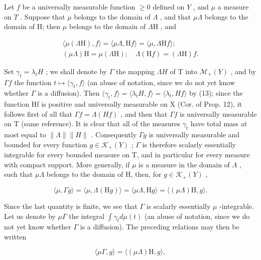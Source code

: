 Let \(f\) be a universally measurable function \(\geqslant 0\) defined on \(Y\) , and \(\mu\) a measure on \(T\) . Suppose that \(\mu\) belongs to the domain of \(\Lambda\) , and that \(\mu \Lambda\) belongs to the domain of H; then \(\mu\) belongs to the domain of \(\Lambda \mathrm{H}\) , and

\[
\begin{array}{l} \langle \mu (\Lambda \mathrm{H}), f \rangle = \langle \mu \Lambda , \mathrm{H} f \rangle = \langle \mu , \Lambda \mathrm{H} f \rangle ; \\ (\mu \Lambda) \mathrm{H} = \mu (\Lambda \mathrm{H}); \quad \Lambda (\mathrm{H} f) = (\Lambda \mathrm{H}) f. \end{array}\tag{15}
\]

Set \(\gamma_{t} = \lambda_{t}H\) ; we shall denote by \(\Gamma\) the mapping \(\Lambda H\) of T into \(\mathcal{M}_{+}(Y)\) , and by \(\Gamma f\) the function \(t \mapsto \langle \gamma_{t}, f \rangle\) (an abuse of notation, since we do not yet know whether \(\Gamma\) is a diffusion). Then \(\langle \gamma_{t}, f \rangle = \langle \lambda_{t}H, f \rangle = \langle \lambda_{t}, Hf \rangle\) by (13); since the function Hf is positive and universally measurable on X (Cor. of Prop. 12), it follows first of all that \(\Gamma f = \Lambda(Hf)\) , and then that \(\Gamma f\) is universally measurable on T (same reference). It is clear that all of the measures \(\gamma_{t}\) have total mass at most equal to \(\|\Lambda\| \|H\|\) . Consequently \(\Gamma g\) is universally measurable and bounded for every function \(g \in \mathcal{K}_{+}(Y)\) ; \(\Gamma\) is therefore scalarly essentially integrable for every bounded measure on T, and in particular for every measure with compact support. More generally, if \(\mu\) is a measure in the domain of \(\Lambda\) , such that \(\mu\Lambda\) belongs to the domain of H, then, for \(g \in \mathcal{K}_{+}(Y)\) ,

\[
\langle \mu , \Gamma g \rangle = \langle \mu , \Lambda (\mathrm{H} g) \rangle = \langle \mu \Lambda , \mathrm{H} g \rangle = \langle (\mu \Lambda) \mathrm{H}, g \rangle .
\]

Since the last quantity is finite, we see that \(\Gamma\) is scalarly essentially \(\mu\) -integrable. Let us denote by \(\mu\Gamma\) the integral \(\int\gamma_{t}d\mu(t)\) (an abuse of notation, since we do not yet know whether \(\Gamma\) is a diffusion). The preceding relations may then be written

\[
\langle \mu \Gamma , g \rangle = \langle (\mu \Lambda) \mathrm{H}, g \rangle ,
\]

